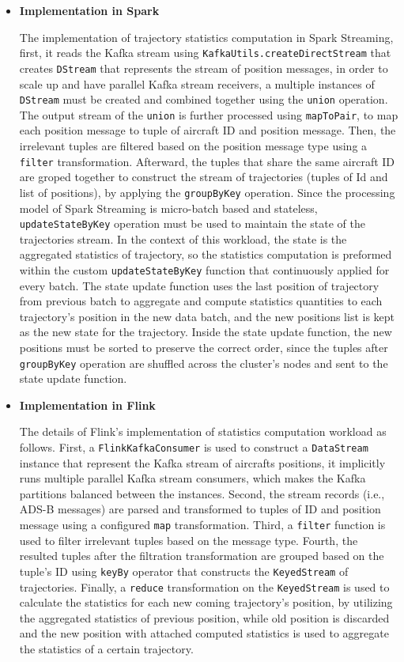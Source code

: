 \documentclass[]{article}
\begin{document}
\begin{itemize}
\item {\bf{Implementation in Spark }}

\par The implementation of trajectory statistics computation in Spark Streaming, first, it reads the Kafka stream using \texttt{KafkaUtils.createDirectStream} that creates \texttt{DStream} that represents the stream of position messages, in order to scale up and have parallel Kafka stream receivers, a multiple instances of \texttt{DStream} must be created and combined together using the \texttt{union} operation. The output stream of the \texttt{union} is further processed using \texttt{mapToPair}, to map each position message to tuple of aircraft ID and position message. Then, the irrelevant tuples are filtered based on the position message type using  a \texttt{filter} transformation. Afterward, the tuples that share the same aircraft ID are groped together to construct the stream of trajectories (tuples of Id and list of positions), by applying the \texttt{groupByKey} operation. Since the processing  model of Spark Streaming is micro-batch based and stateless, \texttt{updateStateByKey} operation must be used to maintain the state of the trajectories stream. In the context of this workload, the state is the aggregated statistics of trajectory, so the statistics computation is preformed within the custom \texttt{updateStateByKey} function that continuously applied for every batch.
 The state update function uses the last position of trajectory from previous batch to aggregate and compute statistics quantities to each trajectory's position in the new data batch, and the new positions list is kept as the new state for the trajectory. Inside the state update function, the new positions must be sorted to preserve the correct order, since the tuples after \texttt{groupByKey} operation are shuffled across the cluster's  nodes and sent to the state update function.

\item {\bf{Implementation in Flink }}


The details of Flink's implementation of statistics computation workload as follows. First, a \texttt{FlinkKafkaConsumer} is used to  construct a \texttt{DataStream} instance that represent the Kafka stream of aircrafts positions, it implicitly runs multiple parallel Kafka stream consumers, which makes the Kafka partitions balanced between the instances. Second, the stream records (i.e., ADS-B messages) are parsed and transformed to tuples of ID and position message using a configured \texttt{map} transformation. Third, a \texttt{filter} function is used to filter irrelevant tuples based on the message type. Fourth, the resulted tuples after the filtration transformation are grouped based on the tuple's ID using \texttt{keyBy} operator that constructs the \texttt{KeyedStream} of trajectories. Finally, 
a \texttt{reduce} transformation on the  \texttt{KeyedStream} is used to calculate the statistics for each new coming trajectory's position, by utilizing the aggregated statistics of previous position, while old position is discarded and the new position with attached computed statistics is used to aggregate the statistics of a certain trajectory.


\end{itemize}
\end{document}
